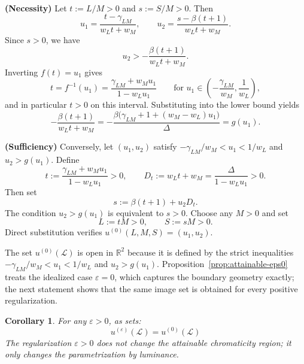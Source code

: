 \documentclass[11pt]{article}
\makeatletter
\theoremstyle{plain}
\newtheorem{corollary}[theorem]{Corollary}
\theoremstyle{definition}
\theoremstyle{remark}
\renewenvironment{proof}[1][\proofname]{\par\pushQED{\qed}\normalfont
\topsep6\p@\@plus6\p@\relax
\trivlist\item[\hskip\labelsep\bfseries #1\@addpunct{.}]\mbox{}\\\ignorespaces}{\popQED\endtrivlist\@endpefalse}
\newcommand{\R}{\mathbb{R}}
\makeatother
\begin{document}
\begin{proof}
\noindent\textbf{(Necessity)} Let $t := L/M > 0$ and $s := S/M > 0$. Then
\[
 u_1 = \frac{t - \gamma_{LM}}{w_L t + w_M},
 \qquad
 u_2 = \frac{s - \beta(t+1)}{w_L t + w_M}.
\]
Since $s > 0$, we have
\[
 u_2 > -\frac{\beta(t+1)}{w_L t + w_M}.
\]
Inverting $f(t) = u_1$ gives
\[
 t = f^{-1}(u_1) = \frac{\gamma_{LM} + w_M u_1}{1 - w_L u_1}
 \qquad \text{for } u_1 \in \left(-\frac{\gamma_{LM}}{w_M}, \frac{1}{w_L}\right),
\]
and in particular $t>0$ on this interval.
Substituting into the lower bound yields
\[
-\frac{\beta(t+1)}{w_L t + w_M}
= -\frac{\beta\bigl(\gamma_{LM} + 1 + (w_M - w_L)u_1\bigr)}{\Delta}
= g(u_1).
\]

\noindent\textbf{(Sufficiency)} Conversely, let $(u_1, u_2)$ satisfy $-\gamma_{LM}/w_M < u_1 < 1/w_L$ and $u_2 > g(u_1)$. Define
\[
 t := \frac{\gamma_{LM} + w_M u_1}{1 - w_L u_1} > 0,
 \qquad
 D_t := w_L t + w_M = \frac{\Delta}{1 - w_L u_1} > 0.
\]
Then set
\[
 s := \beta(t+1) + u_2 D_t.
\]
The condition $u_2 > g(u_1)$ is equivalent to $s > 0$.
Choose any $M > 0$ and set
\[
 L := tM > 0,
 \qquad
 S := sM > 0.
\]
Direct substitution verifies $u^{(0)}(L, M, S) = (u_1, u_2)$.
\end{proof}

The set $u^{(0)}(\mathcal{L})$ is open in $\R^2$ because it is defined by the strict inequalities $-\gamma_{LM}/w_M < u_1 < 1/w_L$ and $u_2 > g(u_1)$. Proposition~\ref{prop:attainable-eps0} treats the idealized case $\varepsilon = 0$, which captures the boundary geometry exactly; the next statement shows that the same image set is obtained for every positive regularization.

\begin{corollary}
\label{cor:attainable-epspos}
For any $\varepsilon > 0$, as sets:
\begin{equation}
u^{(\varepsilon)}(\mathcal{L}) = u^{(0)}(\mathcal{L})
\end{equation}
The regularization $\varepsilon > 0$ does not change the attainable chromaticity region; it only changes the parametrization by luminance.
\end{corollary}
\end{document}
